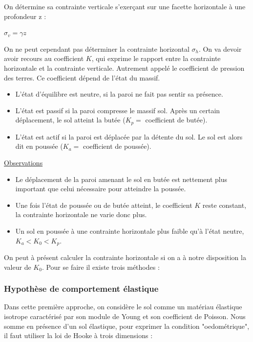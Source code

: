     On détermine sa contrainte verticale s'exerçant sur une facette horizontale à une profondeur z :
    \medskip
    \begin{center}
    $\sigma_v = \gamma z$
    \end{center}
    On ne peut cependant pas déterminer la contrainte horizontal $\sigma_h$. On va devoir avoir recours au coefficient $K$, qui exprime le rapport entre la contrainte horizontale et la contrainte verticale. Autrement appelé le coefficient de pression des terres. Ce coefficient dépend de l'état du massif.
    
    \begin{itemize}
        \item L'état d'équilibre est neutre, si la paroi ne fait pas sentir sa présence.
        \item L'état est passif si la paroi compresse le massif sol. Après un certain déplacement, le sol atteint la butée ($K_p =$ coefficient de butée).
        \item L'état est actif si la paroi est déplacée par la détente du sol. Le sol est alors dit en poussée ($K_a =$ coefficient de poussée).
    \end{itemize}
    
    \medskip
    \underline{Observations} 
    
    \begin{itemize}
        \item Le déplacement de la paroi amenant le sol en butée est nettement plus important que celui nécessaire pour atteindre la poussée.
        \item Une fois l'état de poussée ou de butée atteint, le coefficient $K$ reste constant, la contrainte horizontale ne varie donc plus.
        \item Un sol en poussée à une contrainte horizontale plus faible qu'à l'état neutre, $K_a < K_0 < K_p$.
    \end{itemize}
        
    On peut à présent calculer la contrainte horizontale si on a à notre disposition la valeur de $K_0$. Pour se faire il existe trois méthodes :
    
    \subsubsection{Hypothèse de comportement élastique}
    
        Dans cette première approche, on considère le sol comme un matériau élastique isotrope caractérisé par son module de Young et son coefficient de Poisson. 
        Nous somme en présence d'un sol élastique, pour exprimer la condition "oedométrique", il faut utiliser la loi de Hooke à trois dimensions :
        
